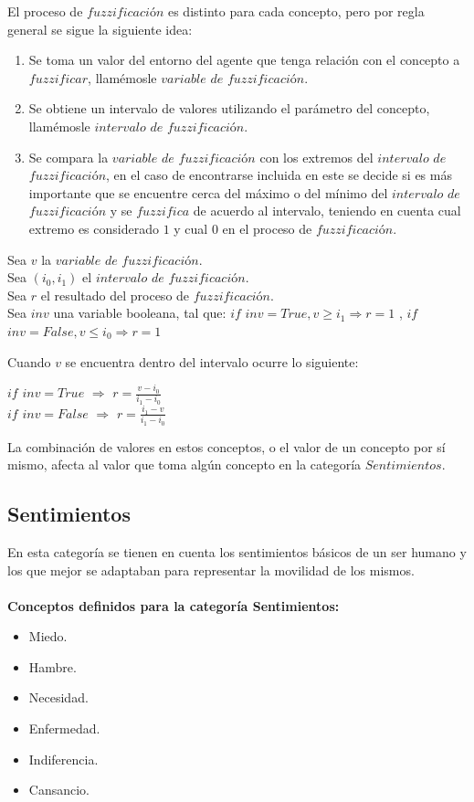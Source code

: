 El proceso de $fuzzificaci$ó$n$ es distinto para cada concepto, pero por regla general se sigue la siguiente idea:
\begin{enumerate}
    \item Se toma un valor del entorno del agente que tenga relación con el concepto a $fuzzificar$, llamémosle $variable$ $de$ $fuzzificaci$ó$n$.
    \item Se obtiene un intervalo de valores utilizando el parámetro del concepto, llamémosle $intervalo$ $de$ $fuzzificaci$ó$n$.
    \item Se compara la $variable$ $de$ $fuzzificaci$ó$n$ con los extremos del $intervalo$ $de$ $fuzzificaci$ó$n$, en el caso de encontrarse incluida en este se decide si es más importante que se encuentre cerca del máximo o del mínimo del $intervalo$ $de$ $fuzzificaci$ó$n$ y se $fuzzifica$ de acuerdo al intervalo, teniendo en cuenta cual extremo es considerado $1$ y cual $0$ en el proceso de $fuzzificaci$ó$n$.
\end{enumerate}

\begin{center}
    Sea $v$ la $variable$ $de$ $fuzzificaci$ó$n$.\\
    Sea $(i_0, i_1)$ el $intervalo$ $de$ $fuzzificaci$ó$n$.\\
    Sea $r$ el resultado del proceso de $fuzzificaci$ó$n$.\\
    Sea $inv$ una variable booleana, tal que: $if$ $inv = True, v \geq i_1 \Rightarrow r = 1$ , $if$ $inv = False, v \leq i_0 \Rightarrow r = 1$\\
\end{center}
    Cuando $v$ se encuentra dentro del intervalo ocurre lo siguiente:
\begin{center}
    $if$ $inv = True$ $\Rightarrow$ $r = \frac{v - i_0}{i_1 - i_0}$\\
    $if$ $inv = False$ $\Rightarrow$ $r = \frac{i_1 - v}{i_1 - i_0}$
\end{center}

La combinación de valores en estos conceptos, o el valor de un concepto por sí mismo, afecta al valor que toma algún
concepto en la categoría $Sentimientos$.

\subsection{Sentimientos}
En esta categoría se tienen en cuenta los sentimientos básicos de un ser humano y los que mejor se adaptaban para
representar la movilidad de los mismos.\\
\\
\textbf{Conceptos definidos para la categoría Sentimientos:}
\begin{itemize}
    \item Miedo.
    \item Hambre.
    \item Necesidad.
    \item Enfermedad.
    \item Indiferencia.
    \item Cansancio.
\end{itemize}

